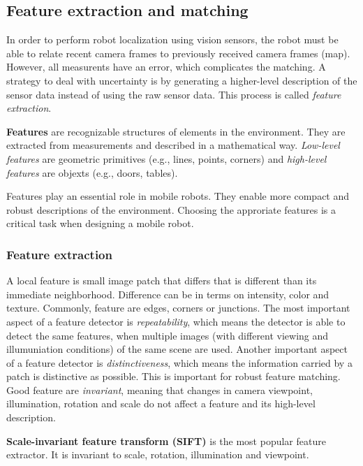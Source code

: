 {\subsection{Feature extraction and matching}
In order to perform robot localization using vision sensors, the robot must be able to relate recent camera frames to previously received camera frames (map).
However, all measurents have an error, which complicates the matching.
A strategy to deal with uncertainty is by generating a higher-level description of the sensor data instead of using the raw sensor data.
This process is called \textit{feature extraction}.

\begin{mydef}
\textbf{Features} are recognizable structures of elements in the environment.
They are extracted from measurements and described in a mathematical way.
\textit{Low-level features} are geometric primitives (e.g., lines, points, corners) and \textit{high-level features} are objexts (e.g., doors, tables).
\end{mydef}

Features play an essential role in mobile robots.
They enable more compact and robust descriptions of the environment.
Choosing the approriate features is a critical task when designing a mobile robot.

\subsubsection{Feature extraction}
A local feature is small image patch that differs that is different than its immediate neighborhood.
Difference can be in terms on intensity, color and texture.
Commonly, feature are edges, corners or junctions.
The most important aspect of a feature detector is \textit{repeatability}, which means the detector is able to detect the same features, when multiple images (with different viewing and illumuniation conditions) of the same scene are used.
Another important aspect of a feature detector is \textit{distinctiveness}, which means the information carried by a patch is distinctive as possible.
This is important for robust feature matching.
Good feature are \textit{invariant}, meaning that changes in camera viewpoint, illumination, rotation and scale do not affect a feature and its high-level description.

\textbf{Scale-invariant feature transform (SIFT)} \cite{lowe1999object} is the most popular feature extractor.
It is invariant to scale, rotation, illumination and viewpoint.

}
